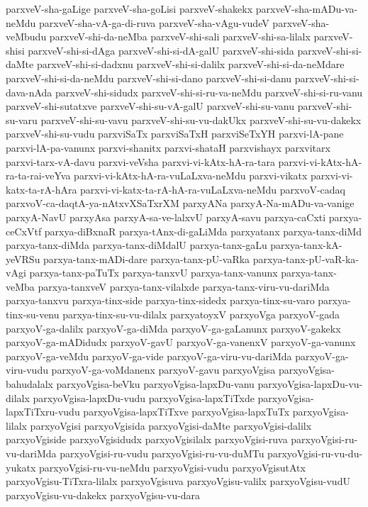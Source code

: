 {parxveV-sha-gaLige
parxveV-sha-goLisi
parxveV-shakekx
parxveV-sha-mADu-va-neMdu
parxveV-sha-vA-ga-di-ruva
parxveV-sha-vAgu-vudeV
parxveV-sha-veMbudu
parxveV-shi-da-neMba
parxveV-shi-sali
parxveV-shi-sa-lilalx
parxveV-shisi
parxveV-shi-si-dAga
parxveV-shi-si-dA-galU
parxveV-shi-sida
parxveV-shi-si-daMte
parxveV-shi-si-dadxnu
parxveV-shi-si-dalilx
parxveV-shi-si-da-neMdare
parxveV-shi-si-da-neMdu
parxveV-shi-si-dano
parxveV-shi-si-danu
parxveV-shi-si-dava-nAda
parxveV-shi-sidudx
parxveV-shi-si-ru-va-neMdu
parxveV-shi-si-ru-vanu
parxveV-shi-sutatxve
parxveV-shi-su-vA-galU
parxveV-shi-su-vanu
parxveV-shi-su-varu
parxveV-shi-su-vavu
parxveV-shi-su-vu-dakUkx
parxveV-shi-su-vu-dakekx
parxveV-shi-su-vudu
parxviSaTx
parxviSaTxH
parxviSeTxYH
parxvi-lA-pane
parxvi-lA-pa-vanunx
parxvi-shanitx
parxvi-shataH
parxvishayx
parxvitarx
parxvi-tarx-vA-davu
parxvi-veVsha
parxvi-vi-kAtx-hA-ra-tara
parxvi-vi-kAtx-hA-ra-ta-rai-veYva
parxvi-vi-kAtx-hA-ra-vuLaLxva-neMdu
parxvi-vikatx
parxvi-vi-katx-ta-rA-hAra
parxvi-vi-katx-ta-rA-hA-ra-vuLaLxva-neMdu
parxvoV-cadaq
parxvoV-ca-daqtA-ya-nAtxvXSaTxrXM
parxyANa
parxyA-Na-mADu-va-vanige
parxyA-NavU
parxyAsa
parxyA-sa-ve-lalxvU
parxyA-savu
parxya-caCxti
parxya-ceCxVtf
parxya-diBxnaR
parxya-tAnx-di-gaLiMda
parxyatanx
parxya-tanx-diMd
parxya-tanx-diMda
parxya-tanx-diMdalU
parxya-tanx-gaLu
parxya-tanx-kA-yeVRSu
parxya-tanx-mADi-dare
parxya-tanx-pU-vaRka
parxya-tanx-pU-vaR-ka-vAgi
parxya-tanx-paTuTx
parxya-tanxvU
parxya-tanx-vanunx
parxya-tanx-veMba
parxya-tanxveV
parxya-tanx-vilalxde
parxya-tanx-viru-vu-dariMda
parxya-tanxvu
parxya-tinx-side
parxya-tinx-sidedx
parxya-tinx-su-varo
parxya-tinx-su-venu
parxya-tinx-su-vu-dilalx
parxyatoyxV
parxyoVga
parxyoV-gada
parxyoV-ga-dalilx
parxyoV-ga-diMda
parxyoV-ga-gaLanunx
parxyoV-gakekx
parxyoV-ga-mADidudx
parxyoV-gavU
parxyoV-ga-vanenxV
parxyoV-ga-vanunx
parxyoV-ga-veMdu
parxyoV-ga-vide
parxyoV-ga-viru-vu-dariMda
parxyoV-ga-viru-vudu
parxyoV-ga-voMdanenx
parxyoV-gavu
parxyoVgisa
parxyoVgisa-bahudalalx
parxyoVgisa-beVku
parxyoVgisa-lapxDu-vanu
parxyoVgisa-lapxDu-vu-dilalx
parxyoVgisa-lapxDu-vudu
parxyoVgisa-lapxTiTxde
parxyoVgisa-lapxTiTxru-vudu
parxyoVgisa-lapxTiTxve
parxyoVgisa-lapxTuTx
parxyoVgisa-lilalx
parxyoVgisi
parxyoVgisida
parxyoVgisi-daMte
parxyoVgisi-dalilx
parxyoVgiside
parxyoVgisidudx
parxyoVgisilalx
parxyoVgisi-ruva
parxyoVgisi-ru-vu-dariMda
parxyoVgisi-ru-vudu
parxyoVgisi-ru-vu-duMTu
parxyoVgisi-ru-vu-du-yukatx
parxyoVgisi-ru-vu-neMdu
parxyoVgisi-vudu
parxyoVgisutAtx
parxyoVgisu-TiTxra-lilalx
parxyoVgisuva
parxyoVgisu-valilx
parxyoVgisu-vudU
parxyoVgisu-vu-dakekx
parxyoVgisu-vu-dara
}

